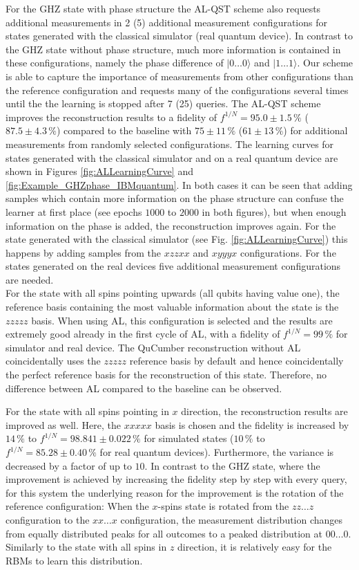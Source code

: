 \documentclass[pra,aps,showpacs,groupedaddress,superscriptaddress,twocolumn,toc=flat,biblatex,footinbib]{revtex4-1}
\newcommand{\ket}[1]{|#1\rangle}
\begin{document}
For the GHZ state with phase structure the AL-QST scheme also requests additional measurements in 2 (5) additional measurement configurations for states generated with the classical simulator (real quantum device). In contrast to the GHZ state without phase structure, much more information is contained in these configurations, namely the phase difference of $\ket{0\dots0}$ and $\ket{1\dots1}$. Our scheme is able to capture the importance of measurements from other configurations than the reference configuration and requests many of the configurations several times until the the learning is stopped after 7 (25) queries. The AL-QST scheme improves the reconstruction results to a fidelity of $f^{1/N}=95.0\pm 1.5\,\%$ ($87.5\pm4.3\,\%$) compared to the baseline with $75\pm11\,\%$ ($61\pm 13\,\%$) for additional measurements from randomly selected configurations. The learning curves for states generated with the classical simulator and on a real quantum device are shown in Figures \ref{fig:ALLearningCurve} and \ref{fig:Example_GHZphase_IBMquantum}. In both cases it can be seen that adding samples which contain more information on the phase structure can confuse the learner at first place (see epochs $1000$ to $2000$ in both figures), but when enough information on the phase is added, the reconstruction improves again. For the state generated with the classical simulator (see Fig. \ref{fig:ALLearningCurve}) this happens by adding samples from the $xzzxx$ and $xyyyx$ configurations. For the states generated on the real devices five additional measurement configurations are needed.\\

For the state with all spins pointing upwards (all qubits having value one), the reference basis containing the most valuable information about the state is the $zzzzz$ basis. When using AL, this configuration is selected and the results are extremely good already in the first cycle of AL, with a fidelity of $f^{1/N}=99\,\%$ for simulator and real device. The QuCumber reconstruction without AL coincidentally uses the $zzzzz$ reference basis by default and hence coincidentally the perfect reference basis for the reconstruction of this state. Therefore, no difference between AL compared to the baseline can be observed.

For the state with all spins pointing in $x$ direction, the reconstruction results are improved as well. Here, the $xxxxx$ basis is chosen and the fidelity is increased by $14\,\%$ to $f^{1/N}=98.841\pm 0.022\,\%$ for simulated states ($10\,\%$ to $f^{1/N}=85.28\pm 0.40\,\%$ for real quantum devices). Furthermore, the variance is decreased by a factor of up to $10$. In contrast to the GHZ state, where the improvement is achieved by increasing the fidelity step by step with every query, for this system the underlying reason for the improvement is the rotation of the reference configuration: When the $x$-spins state is rotated from the $zz\dots z$ configuration to the $xx\dots x$ configuration, the measurement distribution changes from equally distributed peaks for all outcomes to a peaked distribution at $00\dots 0$. Similarly to the state with all spins in $z$ direction, it is relatively easy for the RBMs to learn this distribution. 
\end{document}
